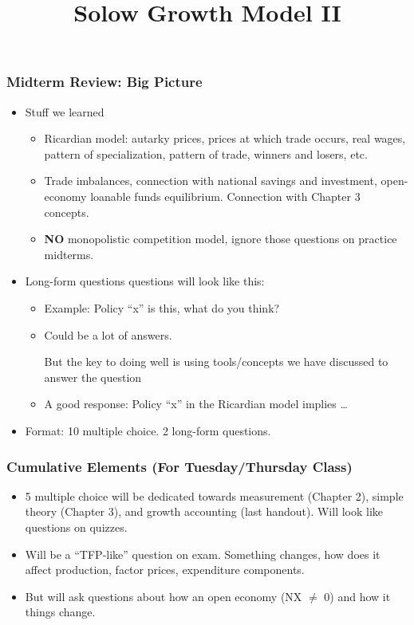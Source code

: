 \documentclass[9pt]{beamer}
\title[NYU Stern] %
{\huge Solow Growth Model II}
\author[Michael Waugh] %
{\bf{\Large}}%
\date[] %
\begin{document}



\begin{frame}[t]
\frametitle{Midterm Review: Big Picture}
\begin{itemize}
\item Stuff we learned
\begin{itemize}
\medskip
\item Ricardian model: autarky prices, prices at which trade occurs, real wages, pattern of specialization, pattern of trade, winners and losers, etc.
\medskip
\item Trade imbalances, connection with national savings and investment, open-economy loanable funds equilibrium. Connection with Chapter 3 concepts.
\medskip
\item \textbf{NO} monopolistic competition model, ignore those questions on practice midterms.
\end{itemize}
\bigskip
\item Long-form questions questions will look like this:
\begin{itemize}
\medskip
\item Example: Policy ``x'' is this, what do you think?
\medskip
\item Could be a lot of answers. \begin{alertenv}{But the key to doing well is using tools/concepts we have discussed to answer the question}\end{alertenv}
\medskip
\item A good response: Policy ``x'' in the Ricardian model implies \ldots
\end{itemize}
\medskip
\item Format: 10 multiple choice. 2 long-form questions.
\end{itemize}
\bigskip
\end{frame}



\begin{frame}[t]
\frametitle{Cumulative Elements (For Tuesday/Thursday Class)}
\begin{itemize}
\item 5 multiple choice will be dedicated towards measurement (Chapter 2), simple theory (Chapter 3), and growth accounting (last handout). Will look like questions on quizzes. 
\medskip
\item Will be a ``TFP-like'' question on exam. Something changes, how does it affect production, factor prices, expenditure components.
\medskip
\item But will ask questions about how an open economy (NX $\neq$ 0) and how it things change.
\end{itemize}
\end{frame}
\end{document}
